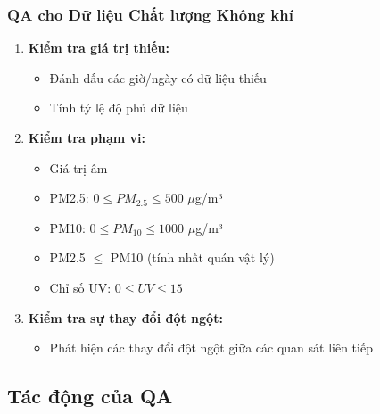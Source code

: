 \documentclass[12pt,a4paper]{article}
\begin{document}
\subsubsection{QA cho Dữ liệu Chất lượng Không khí}
\begin{enumerate}
    \item \textbf{Kiểm tra giá trị thiếu:}
    \begin{itemize}
        \item Đánh dấu các giờ/ngày có dữ liệu thiếu
        \item Tính tỷ lệ độ phủ dữ liệu
    \end{itemize}
    
    \item \textbf{Kiểm tra phạm vi:}
    \begin{itemize}
        \item Giá trị âm
        \item PM2.5: $0 \leq PM_{2.5} \leq 500$ $\mu$g/m³
        \item PM10: $0 \leq PM_{10} \leq 1000$ $\mu$g/m³
        \item PM2.5 $\leq$ PM10 (tính nhất quán vật lý)
        \item Chỉ số UV: $0 \leq UV \leq 15$
    \end{itemize}
    
    \item \textbf{Kiểm tra sự thay đổi đột ngột:}
    \begin{itemize}
        \item Phát hiện các thay đổi đột ngột giữa các quan sát liên tiếp
    \end{itemize}
\end{enumerate}

\subsection{Tác động của QA}
\end{document}
